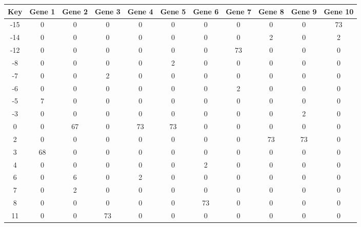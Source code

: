 \begin{tabular}{|c|c|c|c|c|c|c|c|c|c|c|}
\hline
Key & Gene 1 & Gene 2 & Gene 3 & Gene 4 & Gene 5 & Gene 6 & Gene 7 & Gene 8 & Gene 9 & Gene 10 \\
\hline
-15 & 0 & 0 & 0 & 0 & 0 & 0 & 0 & 0 & 0 & 73 \\
-14 & 0 & 0 & 0 & 0 & 0 & 0 & 0 & 2 & 0 & 2 \\
-12 & 0 & 0 & 0 & 0 & 0 & 0 & 73 & 0 & 0 & 0 \\
-8 & 0 & 0 & 0 & 0 & 2 & 0 & 0 & 0 & 0 & 0 \\
-7 & 0 & 0 & 2 & 0 & 0 & 0 & 0 & 0 & 0 & 0 \\
-6 & 0 & 0 & 0 & 0 & 0 & 0 & 2 & 0 & 0 & 0 \\
-5 & 7 & 0 & 0 & 0 & 0 & 0 & 0 & 0 & 0 & 0 \\
-3 & 0 & 0 & 0 & 0 & 0 & 0 & 0 & 0 & 2 & 0 \\
0 & 0 & 67 & 0 & 73 & 73 & 0 & 0 & 0 & 0 & 0 \\
2 & 0 & 0 & 0 & 0 & 0 & 0 & 0 & 73 & 73 & 0 \\
3 & 68 & 0 & 0 & 0 & 0 & 0 & 0 & 0 & 0 & 0 \\
4 & 0 & 0 & 0 & 0 & 0 & 2 & 0 & 0 & 0 & 0 \\
6 & 0 & 6 & 0 & 2 & 0 & 0 & 0 & 0 & 0 & 0 \\
7 & 0 & 2 & 0 & 0 & 0 & 0 & 0 & 0 & 0 & 0 \\
8 & 0 & 0 & 0 & 0 & 0 & 73 & 0 & 0 & 0 & 0 \\
11 & 0 & 0 & 73 & 0 & 0 & 0 & 0 & 0 & 0 & 0 \\
\hline
\end{tabular}